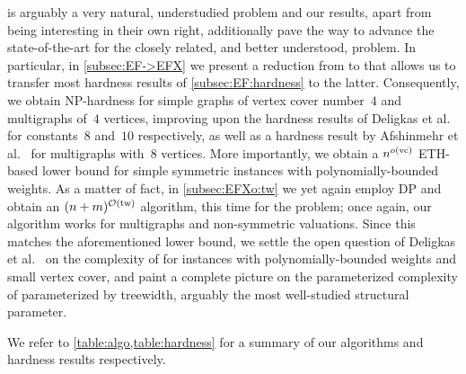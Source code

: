 {\EFo} is arguably a very natural, understudied problem and our results, apart from being interesting in their own right,
additionally pave the way to advance the state-of-the-art for the closely related, and better understood, {\EFXo} problem.
In particular, in \cref{subsec:EF->EFX} we present a reduction from {\EFo} to {\EFXo} that allows us to transfer most hardness results of \cref{subsec:EF:hardness}
to the latter. Consequently, we obtain NP-hardness for simple graphs
of vertex cover number~$4$ and multigraphs of~$4$ vertices, improving upon the hardness results of Deligkas et al.~\cite{ijcai/DeligkasEGK25} for constants~$8$ and~$10$ respectively, as well as a hardness result by Afshinmehr et al.~\cite{AfshinmehrDKMR25} for multigraphs with~$8$ vertices.
More importantly, we obtain a $n^{o(\mathrm{vc})}$ ETH-based lower bound for simple symmetric instances with polynomially-bounded weights.
As a matter of fact, in \cref{subsec:EFXo:tw} we yet again employ DP and obtain an $(n+m)^{\mathcal{O}(\mathrm{tw})}$ algorithm,
this time for the {\EFXmc} problem; once again, our algorithm works for multigraphs and non-symmetric valuations.
Since this matches the aforementioned lower bound, we settle the open question of Deligkas et al.~\cite{ijcai/DeligkasEGK25} on the complexity of {\EFXo} for instances with
polynomially-bounded weights and small vertex cover, and paint a complete picture
on the parameterized complexity of {\EFXo} parameterized by treewidth, arguably the most well-studied structural parameter.

We refer to \cref{table:algo,table:hardness} for a summary of our algorithms and hardness results respectively.



